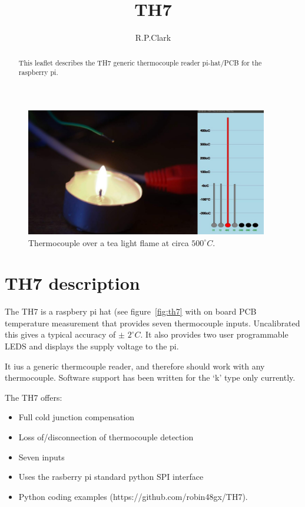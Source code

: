 \documentclass[a4paper,10pt]{article}
\title{TH7}
\author{R.P.Clark}
\begin{document}
\maketitle
\begin{abstract}
This leaflet describes the TH7 generic thermocouple reader pi-hat/PCB for the raspberry pi.
\end{abstract}

\begin{figure}[ht]
 \centering
 \includegraphics[width=300pt]{TH7_tea_light.JPG}
 \caption{Thermocouple over a tea light flame at circa ${500}^{\circ} C$.}
 \label{fig:pi}
\end{figure}

\section{TH7 description}
The TH7 is a raspbery pi hat (see figure~\ref{fig:th7} with on board PCB temperature measurement that
provides seven thermocouple inputs.
Uncalibrated this gives a typical accuracy of $\pm$ ${2}^{\circ} C$.
It also provides two user programmable LEDS and displays the supply voltage to the pi.

It ius a generic thermcouple reader, and therefore should work with any thermocouple.
Software support has been written for the `k' type only currently.

The TH7 offers:
\begin{itemize}
 \item Full cold junction compensation
 \item Loss of/disconnection of thermocouple detection
 \item Seven inputs
 \item Uses the rasberry pi standard python SPI interface
 \item Python coding examples (https://github.com/robin48gx/TH7).
\end{itemize} 
\end{document}
